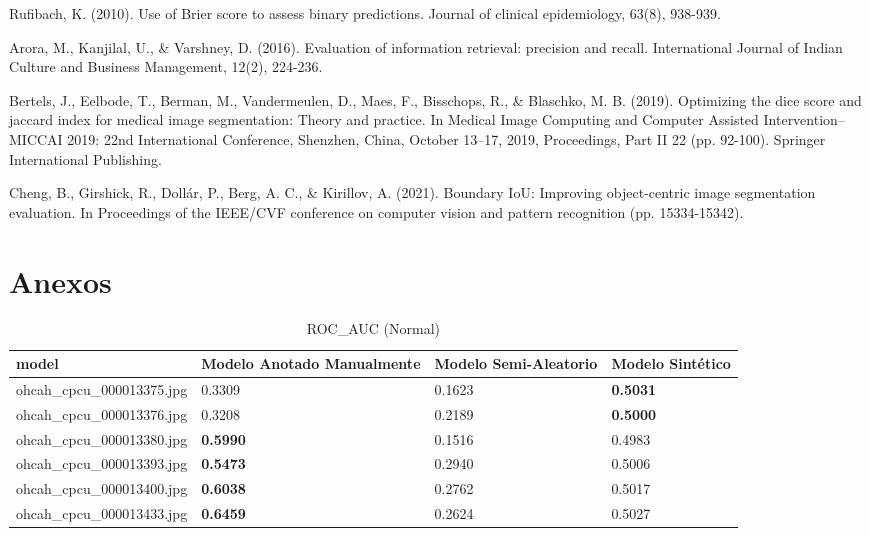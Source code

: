 \documentclass[twocolumn, fontsize=10pt]{article}
\begin{document}
\begin{thebibliography}{}
     Rufibach, K. (2010). Use of Brier score to assess binary predictions. Journal of clinical epidemiology, 63(8), 938-939.

     Arora, M., Kanjilal, U., \& Varshney, D. (2016). Evaluation of information retrieval: precision and recall. International Journal of Indian Culture and Business Management, 12(2), 224-236.

     Bertels, J., Eelbode, T., Berman, M., Vandermeulen, D., Maes, F., Bisschops, R., \& Blaschko, M. B. (2019). Optimizing the dice score and jaccard index for medical image segmentation: Theory and practice. In Medical Image Computing and Computer Assisted Intervention–MICCAI 2019: 22nd International Conference, Shenzhen, China, October 13–17, 2019, Proceedings, Part II 22 (pp. 92-100). Springer International Publishing.

     Cheng, B., Girshick, R., Dollár, P., Berg, A. C., \& Kirillov, A. (2021). Boundary IoU: Improving object-centric image segmentation evaluation. In Proceedings of the IEEE/CVF conference on computer vision and pattern recognition (pp. 15334-15342).
\end{thebibliography}

\newpage

\section{Anexos}

\begin{table*}[ht]
\centering
\caption{ROC\_AUC (Normal)}
\label{tab:roc_auc_normal}
\setlength{\tabcolsep}{6pt} %
\renewcommand{\arraystretch}{1.2} %
\begin{tabular}{|l|l|l|l|}
\hline
model & Modelo Anotado Manualmente & Modelo Semi-Aleatorio & Modelo Sintético \\ \hline
ohcah\_cpcu\_000013375.jpg & 0.3309 & 0.1623 & \textbf{0.5031} \\ \hline
ohcah\_cpcu\_000013376.jpg & 0.3208 & 0.2189 & \textbf{0.5000} \\ \hline
ohcah\_cpcu\_000013380.jpg & \textbf{0.5990} & 0.1516 & 0.4983 \\ \hline
ohcah\_cpcu\_000013393.jpg & \textbf{0.5473} & 0.2940 & 0.5006 \\ \hline
ohcah\_cpcu\_000013400.jpg & \textbf{0.6038} & 0.2762 & 0.5017 \\ \hline
ohcah\_cpcu\_000013433.jpg & \textbf{0.6459} & 0.2624 & 0.5027 \\ \hline
\end{tabular}
\end{table*}
\end{document}
